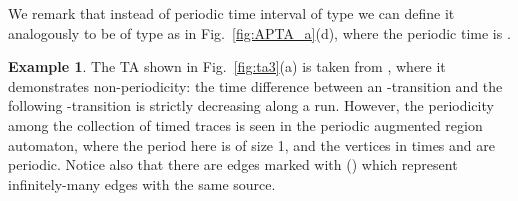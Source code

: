 \documentclass[11pt]{amsart}
\theoremstyle{definition}
\newtheorem{example}[theorem]{Example}
\begin{document}
We remark that instead of periodic time interval of type  we can define it analogously to be of type  as in Fig.~\ref{fig:APTA_a}(d), where the periodic time is .
\begin{example}
	\label{ex:non-period}
	The TA shown in Fig.~\ref{fig:ta3}(a) is taken from \cite{ta}, where it demonstrates non-periodicity: the time difference between an -transition and the following -transition is strictly decreasing along a run.
However, the periodicity among the collection of timed traces is seen in the periodic augmented region automaton, where the period here is of size 1, and the vertices in times  and  are periodic.
	Notice also that there are edges marked with () which represent infinitely-many edges with the same source.
\begin{figure}[htb]
\centering
\end{figure}
\end{example}
\end{document}
